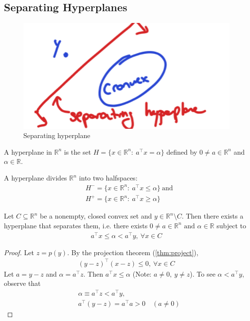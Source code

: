 \documentclass[11pt]{article}
\numberwithin{equation}{section}
\begin{document}
\subsection{Separating Hyperplanes}
\begin{figure}[ht]
    \centering
    \includegraphics[scale = 0.5]{images/3-ex-2.png}
    \caption{Separating hyperplane}
\end{figure}

\begin{definition}
    A hyperplane in $\mathbb{R}^n$ is the set $H=\{ x \in \mathbb{R}^n:\ a^\top x=\alpha \}$ defined by $0 \neq a \in \mathbb{R}^n$ and $\alpha \in \mathbb{R}$.
\end{definition}
\begin{definition}
    A hyperplane divides $\mathbb{R}^n$ into two halfspaces: \begin{align*}
        & H^-=\{ x \in \mathbb{R}^n:\ a^\top x\leq \alpha \} \ \text{and} \\
        & H^+=\{ x \in \mathbb{R}^n:\ a^\top x\geq\alpha \}
    \end{align*}
\end{definition}

\begin{theorem}\label{thm:Separating Hyperplane}
    Let $C \subseteq \mathbb{R}^n$ be a nonempty, closed convex set and $y\in \mathbb{R}^n \setminus C$. Then there exists a hyperplane that separates them,
    i.e. there exists $0 \neq a \in \mathbb{R}^n \text{ and } \alpha \in \mathbb{R}$ subject to \begin{align*}
        a^\top x\leq \alpha < a^\top y, \ \forall x \in C
    \end{align*}
    \begin{proof}
        Let $z=p(y)$. By the projection theorem (\ref{thm:project}),\begin{align*}
            (y-z)^\top (x - z)\leq 0, \ \forall x \in C 
        \end{align*}
        Let $a = y-z$ and $\alpha =a^\top z$.
        Then $a^\top x\leq \alpha$ (Note: $a \neq 0, \ y \neq z$). 
        To see $\alpha < a^\top y$, observe that \begin{align*}
            & \alpha \equiv a^\top z < a^\top y, \\
            & a^\top (y-z)=a^\top a>0 \quad (a \neq 0)
        \end{align*}
    \end{proof}    
\end{theorem}
\end{document}

